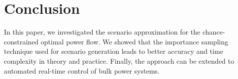 \documentclass{IEEEtran4PSCC}
\begin{document}




\section{Conclusion}
\label{sec:conclusion}

In this paper, we investigated the scenario approximation for the chance-constrained optimal power flow. We showed that the importance sampling technique used for scenario generation leads to better accuracy and time complexity in theory and practice. Finally, the approach can be extended to automated real-time control of bulk power systems. 



%
%
%






\end{document}
